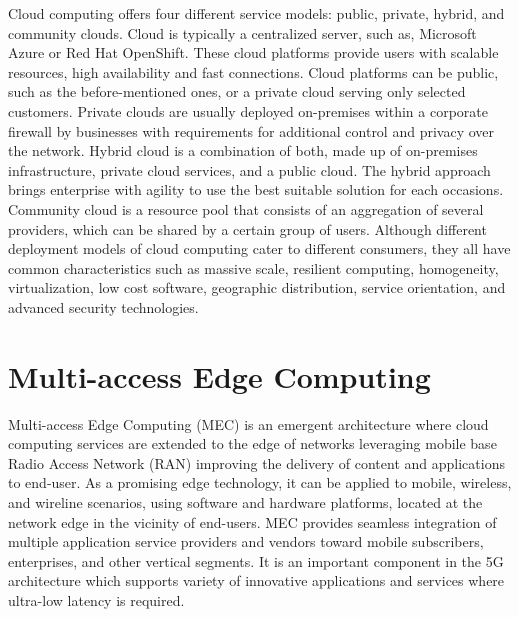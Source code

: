 Cloud computing offers four different service models: public, private, hybrid, and community clouds. Cloud is typically a centralized server, such as, Microsoft Azure or Red Hat OpenShift. These cloud platforms provide users with scalable resources, high availability and fast connections. Cloud platforms can be public, such as the before-mentioned ones, or a private cloud serving only selected customers. Private clouds are usually deployed on-premises within a corporate firewall by businesses with requirements for additional control and privacy over the network. Hybrid cloud is a combination of both, made up of on-premises infrastructure, private cloud services, and a public cloud. The hybrid approach brings enterprise with agility to use the best suitable solution for each occasions. \cite{NetApp} Community cloud is a resource pool that consists of an aggregation of several providers, which can be shared by a certain group of users. Although different deployment models of cloud computing cater to different consumers, they all have common characteristics such as massive scale, resilient computing, homogeneity, virtualization, low cost software, geographic distribution, service orientation, and advanced security technologies. \cite{MicrosoftAzure}\cite{Taleb2017}\cite{Xing2012}









\section{Multi-access Edge Computing}

Multi-access Edge Computing (MEC) is an emergent architecture where cloud computing services are extended to the edge of networks leveraging mobile base Radio Access Network (RAN) improving the delivery of content and applications to end-user. As a promising edge technology, it can be applied to mobile, wireless, and wireline scenarios, using software and hardware platforms, located at the network edge in the vicinity of end-users. MEC provides seamless integration of multiple application service providers and vendors toward mobile subscribers, enterprises, and other vertical segments. It is an important component in the 5G architecture which supports variety of innovative applications and services where ultra-low latency is required. \cite{Abbas2018}

